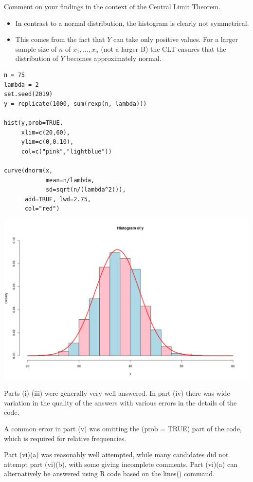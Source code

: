 \documentclass[a4paper,12pt]{article}
\begin{document}
\newpage 

\noindent Comment on your findings in the context of the Central
Limit Theorem.

\begin{itemize}
    \item In contrast to a normal distribution, the histogram is clearly not symmetrical.

\item This comes from the fact that $Y$ can take only positive values.
For a larger sample size of $n$ of $x_1 , ... , x_n$ (not a larger B) the CLT ensures that the
distribution of $Y$ becomes approximately normal.
\end{itemize}

\newpage
\begin{framed}
\begin{verbatim}
n = 75
lambda = 2
set.seed(2019)
y = replicate(1000, sum(rexp(n, lambda)))

hist(y,prob=TRUE,
     xlim=c(20,60),
     ylim=c(0,0.10),
     col=c("pink","lightblue"))

curve(dnorm(x,
            mean=n/lambda,
            sd=sqrt(n/(lambda^2))), 
      add=TRUE, lwd=2.75, 
      col="red")

\end{verbatim}
\end{framed}
\newpage
\includegraphics[scale=0.5]{00-C1/images/00-C1-Q3-Curve-Q3.png}

\newpage 
Parts (i)-(iii) were generally very well answered. In part (iv) there was wide variation in
the quality of the answers with various errors in the details of the code. 

A common error in part (v) was omitting the (prob = TRUE) part of the code, which is required for relative frequencies. 

Part (vi)(a) was reasonably well attempted, while many candidates did not
attempt part (vi)(b), with some giving incomplete comments. Part (vi)(a) can alternatively
be answered using R code based on the lines() command.
\end{document}
